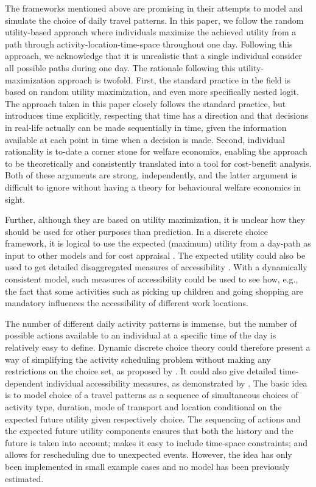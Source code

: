 The frameworks mentioned above are promising in their attempts to model and simulate the choice of daily travel patterns. 
In this paper, we follow the random utility-based approach where individuals maximize the achieved utility from a path through activity-location-time-space throughout one day. Following this approach, we acknowledge that it is unrealistic that a single individual consider all possible paths during one day. The rationale following this utility-maximization approach is twofold. First, the standard practice in the field is based on random utility maximization, and even more specifically nested logit. The approach taken in this paper closely follows the standard practice, but introduces time explicitly, respecting that time has a direction and that decisions in real-life actually can be made sequentially in time, given the information available at each point in time when a decision is made. Second, individual rationality is to-date a corner stone for welfare economics, enabling the approach to be theoretically and consistently translated into a tool for cost-benefit analysis. Both of these arguments are strong, independently, and the latter argument is difficult to ignore without having a theory for behavioural welfare economics in sight. 

Further, although they are based on utility maximization, it is unclear how they should be used for other purposes than prediction. In a discrete choice framework, it is logical to use the expected (maximum) utility from a day-path as input to other models and for cost appraisal \citep{Geurs10}. The expected utility could also be used to get detailed disaggregated measures of accessibility \citep{Dong06, Jonsson13}. With a dynamically consistent model, such measures of accessibility could be used to see how, e.g., the fact that some activities such as picking up children and going shopping are mandatory influences the accessibility of different work locations.


The number of different daily activity patterns is immense, but the number of possible actions available to an individual at a specific time of the day is relatively easy to define. Dynamic discrete choice theory could therefore present a way of simplifying the activity scheduling problem without making any restrictions on the choice set, as proposed by \citet{karlstrom04}. It could also give detailed time-dependent individual accessibility measures, as demonstrated by \citet{Jonsson13}. The basic idea is to model choice of a travel patterns as a sequence of simultaneous choices of activity type, duration, mode of transport and location conditional on the expected future utility given respectively choice. The sequencing of actions and the expected future utility components ensures that both the history and the future is taken into account; makes it easy to include time-space constraints; and allows for rescheduling due to unexpected events. However, the idea has only been implemented in small example cases and no model has been previously estimated. 

